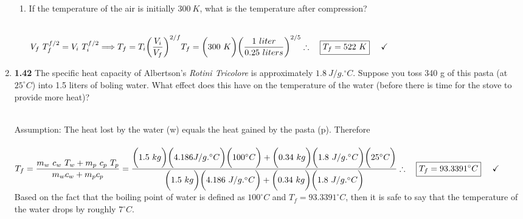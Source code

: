 \documentclass[fleqn]{article}
\begin{document}
\begin{enumerate}
\begin{enumerate}
      \item If the temperature of the air is initially $300 ~ K$, what is the temperature after compression?

        \textcolor{hwColor}{
          \\
          $
            V_f ~ T^{f/2}_f=V_i ~ T^{f/2}_i \Longrightarrow T_f=T_i \bigg( \dfrac{V_i}{V_f} \bigg)^{2/f}
            \\
            \\
            \\
            T_f=\bigg( 300 ~ K \bigg) \bigg( \dfrac{1 ~ liter}{0.25 ~ liters} \bigg)^{2/5}
            \\
            \\
            \\
            \therefore ~~~ \boxed{
              T_f=522 ~ K
            } ~~~~ \checkmark
            \\
            \\
          $
        }

    \end{enumerate}

    \item \textbf{1.42} The specific heat capacity of Albertson's \emph{Rotini Tricolore} is approximately $1.8 ~ J/g.^{\circ}C$. Suppose 
    you toss 340 g of this pasta (at $25^{\circ}C$) into 1.5 liters of boling water. What effect does this have on the temperature of the
    water (before there is time for the stove to provide more heat)?

      \textcolor{hwColor}{
        \\
        Assumption: The heat lost by the water (w) equals the heat gained by the pasta (p). Therefore
        \\
        \\
        $
          T_f=\dfrac{
            m_w ~ c_w ~ T_w + m_p ~ c_p ~ T_p
          }{
            m_w c_w+m_p c_p
          }
          =\dfrac{
            \bigg( 1.5 ~ kg \bigg) \bigg( 4.186 J/g.^{\circ} C \bigg) \bigg( 100^{\circ} C\bigg)+ \bigg( 0.34 ~ kg \bigg) \bigg( 1.8 ~ J/g.^{\circ} C \bigg) \bigg( 25^{\circ} C \bigg)
          }{
            \bigg( 1.5 ~ kg \bigg) \bigg( 4.186 ~ J/g.^{\circ} C \bigg) + \bigg( 0.34 ~ kg \bigg) \bigg( 1.8 ~ J/g.^{\circ} C \bigg)
          }
          \\
          \\
          \\
          \therefore ~~~ \boxed{
            T_f=93.3391^{\circ}C
          } ~~~~ \checkmark
          \\
          \\
        $
        Based on the fact that the boiling point of water is defined as $100^{\circ}C$ and $T_f=93.3391^{\circ}C$, then
        it is safe to say that the temperature of the water drops by roughly $7^{\circ}C$.
      }

  \end{enumerate}
\end{document}

